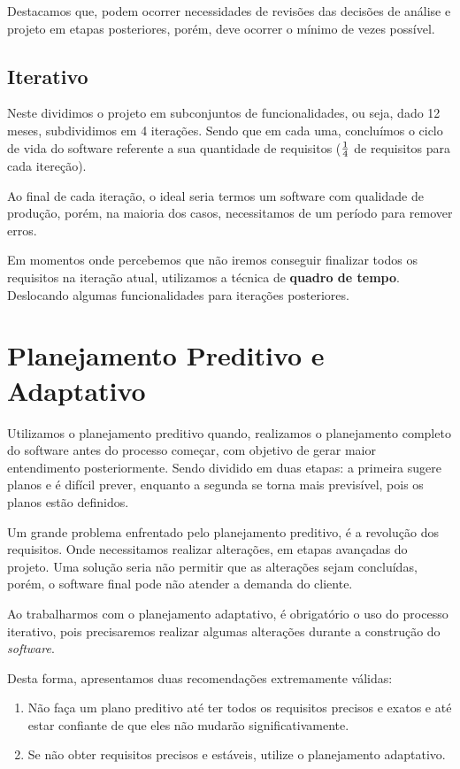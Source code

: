 \documentclass[a4paper, 12pt]{report}
\begin{document}
	Destacamos que, podem ocorrer necessidades de revisões das decisões de análise e projeto em etapas posteriores, porém, deve ocorrer o mínimo de vezes possível.

	\subsection{Iterativo}
	
	Neste dividimos o projeto em subconjuntos de funcionalidades, ou seja, dado 12 meses, subdividimos em 4 iterações. Sendo que em cada uma, concluímos o ciclo de vida do software referente a sua quantidade de requisitos ($1 \over 4$ de requisitos para cada itereção).
	
	Ao final de cada iteração, o ideal seria termos um software com qualidade de produção, porém, na maioria dos casos, necessitamos de um período para remover erros.
	
	Em momentos onde percebemos que não iremos conseguir finalizar todos os requisitos na iteração atual, utilizamos a técnica de \textbf{quadro de tempo}. Deslocando algumas funcionalidades para iterações posteriores.


	\section{Planejamento Preditivo e Adaptativo}
	
	Utilizamos o planejamento preditivo quando, realizamos o planejamento completo do software antes do processo começar, com objetivo de gerar maior entendimento posteriormente. Sendo dividido em duas etapas: a primeira sugere planos e é difícil prever, enquanto a segunda se torna mais previsível, pois os planos estão definidos.
	
	Um grande problema enfrentado pelo planejamento preditivo, é a revolução dos requisitos. Onde necessitamos realizar alterações, em etapas avançadas do projeto. Uma solução seria não permitir que as alterações sejam concluídas, porém, o software final pode não atender a demanda do cliente.

	Ao trabalharmos com o planejamento adaptativo, é obrigatório o uso do processo iterativo, pois precisaremos realizar algumas alterações durante a construção do \textit{software}.
	
	Desta forma, apresentamos duas recomendações extremamente válidas:
	
	\begin{enumerate}
		\item Não faça um plano preditivo até ter todos os requisitos precisos e exatos e até estar confiante de que eles não mudarão significativamente.
		
		\item Se não obter requisitos precisos e estáveis, utilize o planejamento adaptativo. 
	\end{enumerate}
\end{document}
